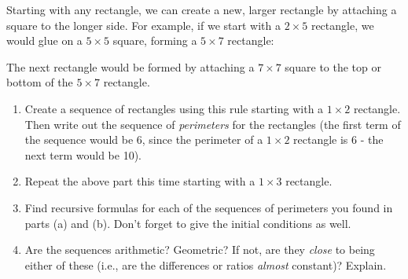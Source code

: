 \documentclass[11pt,]{book}
\theoremstyle{ptxplainnotitle}
\theoremstyle{ptxplaintitle}
\theoremstyle{ptxdefinitionnotitle}
\theoremstyle{ptxdefinitiontitle}
\theoremstyle{ptxdefinitionnotitle}
\theoremstyle{ptxdefinitiontitle}
\theoremstyle{ptxdefinitionnotitle}
\theoremstyle{ptxdefinitiontitle}
\theoremstyle{ptxdefinitiontitlenonumber}
\theoremstyle{ptxdefinitiontitlenonumber}
\numberwithin{equation}{chapter}
\begin{document}
\begin{divisionexercise}{14}\hypertarget{exercise-26}{}
\hypertarget{p-324}{}%
Starting with any rectangle, we can create a new, larger rectangle by attaching a square to the longer side. For example, if we start with a \(2\times 5\) rectangle, we would glue on a \(5\times 5\) square, forming a \(5 \times 7\) rectangle:%
\begin{sidebyside}{1}{0.2}{0.2}{0}
\begin{sbspanel}{0.6}
\end{sbspanel}
\end{sidebyside}
\par
\hypertarget{p-325}{}%
The next rectangle would be formed by attaching a \(7 \times 7\) square to the top or bottom of the \(5\times 7\) rectangle.  \leavevmode%
\begin{enumerate}[label=(\alph*)]
\item\hypertarget{li-184}{}\hypertarget{p-326}{}%
Create a sequence of rectangles using this rule starting with a \(1\times 2\) rectangle. Then write out the sequence of \emph{perimeters} for the rectangles (the first term of the sequence would be 6, since the perimeter of a \(1\times 2\) rectangle is 6 - the next term would be 10). %
\item\hypertarget{li-185}{}\hypertarget{p-327}{}%
Repeat the above part this time starting with a \(1 \times 3\) rectangle. %
\item\hypertarget{li-186}{}\hypertarget{p-328}{}%
Find recursive formulas for each of the sequences of perimeters you found in parts (a) and (b). Don't forget to give the initial conditions as well. %
\item\hypertarget{li-187}{}\hypertarget{p-329}{}%
Are the sequences arithmetic? Geometric? If not, are they \emph{close} to being either of these (i.e., are the differences or ratios \emph{almost} constant)? Explain. %
\end{enumerate}
%
\end{divisionexercise}%
\end{document}
